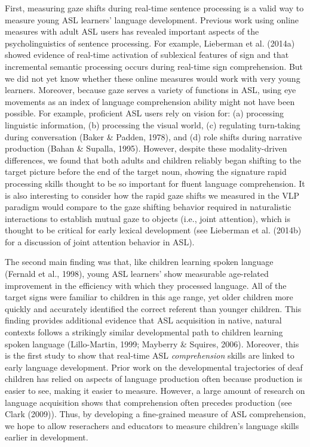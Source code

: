 \documentclass[12pt,]{article}
\begin{document}
First, measuring gaze shifts during real-time sentence processing is a
valid way to measure young ASL learners' language development. Previous
work using online measures with adult ASL users has revealed important
aspects of the psycholinguistics of sentence processing. For example,
Lieberman et al. (2014a) showed evidence of real-time activation of
sublexical features of sign and that incremental semantic processing
occurs during real-time sign comprehension. But we did not yet know
whether these online measures would work with very young learners.
Moreover, because gaze serves a variety of functions in ASL, using eye
movements as an index of language comprehension ability might not have
been possible. For example, proficient ASL users rely on vision for: (a)
processing linguistic information, (b) processing the visual world, (c)
regulating turn-taking during conversation (Baker \& Padden, 1978), and
(d) role shifts during narrative production (Bahan \& Supalla, 1995).
However, despite these modality-driven differences, we found that both
adults and children reliably began shifting to the target picture before
the end of the target noun, showing the signature rapid processing
skills thought to be so important for fluent language comprehension. It
is also interesting to consider how the rapid gaze shifts we measured in
the VLP paradigm would compare to the gaze shifting behavior required in
naturalistic interactions to establish mutual gaze to objects (i.e.,
joint attention), which is thought to be critical for early lexical
development (see Lieberman et al. (2014b) for a discussion of joint
attention behavior in ASL).

The second main finding was that, like children learning spoken language
(Fernald et al., 1998), young ASL learners' show measurable age-related
improvement in the efficiency with which they processed language. All of
the target signs were familiar to children in this age range, yet older
children more quickly and accurately identified the correct referent
than younger children. This finding provides additional evidence that
ASL acquisition in native, natural contexts follows a strikingly similar
developmental path to children learning spoken language (Lillo-Martin,
1999; Mayberry \& Squires, 2006). Moreover, this is the first study to
show that real-time ASL \emph{comprehension} skills are linked to early
language development. Prior work on the developmental trajectories of
deaf children has relied on aspects of language production often because
production is easier to see, making it easier to measure. However, a
large amount of research on language acquisition shows that
comprehension often precedes production (see Clark (2009)). Thus, by
developing a fine-grained measure of ASL comprehension, we hope to allow
reserachers and educators to measure children's language skills earlier
in development.
\end{document}
